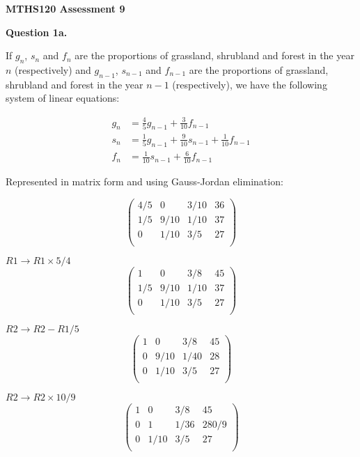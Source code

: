 \documentclass[12pt,a4paper]{report}
\begin{document}
\textbf{MTHS120 Assessment 9}

\textbf{Question 1a.}

If \(g_n\), \(s_n\) and \(f_n\) are the proportions of grassland, shrubland and forest in the year \(n\) (respectively) and \(g_{n-1}\), \(s_{n-1}\) and \(f_{n-1}\) are the proportions of grassland, shrubland and forest in the year \(n-1\) (respectively), we have the following system of linear equations:

\begin{align*}
g_n &= \frac{4}{5}g_{n-1} + \frac{3}{10}f_{n-1} \\
s_n &= \frac{1}{5}g_{n-1} + \frac{9}{10}s_{n-1} + \frac{1}{10}f_{n-1} \\
f_n &= \frac{1}{10}s_{n-1} + \frac{6}{10}f_{n-1}
\end{align*} 

Represented in matrix form and using Gauss-Jordan elimination:

 \[
 \left(\begin{array}{rrr|r}
 4/5 & 0 & 3/10 & 36  \\
 1/5 & 9/10 & 1/10 & 37   \\
 0 & 1/10 & 3/5 & 27   \\
   \end{array} \right)
\]
 
\(R1 \rightarrow R1 \times 5/4 \)
  \[
 \left(\begin{array}{rrr|r}
 1 & 0 & 3/8 & 45   \\
 1/5 & 9/10 & 1/10 & 37   \\
 0 & 1/10 & 3/5 & 27   \\
   \end{array} \right)
\]
 
\(R2 \rightarrow R2 - R1 / 5 \)
  \[
 \left(\begin{array}{rrr|r}
 1 & 0 & 3/8 & 45   \\
 0 & 9/10 & 1/40 & 28   \\
 0 & 1/10 & 3/5 & 27   \\
   \end{array} \right)
\]
 
\(R2 \rightarrow R2 \times 10/9 \)
  \[
 \left(\begin{array}{rrr|r}
 1 & 0 & 3/8 & 45   \\
 0 & 1 & 1/36 & 280/9  \\
 0 & 1/10 & 3/5 & 27   \\
   \end{array} \right)
\]
 
\end{document}
